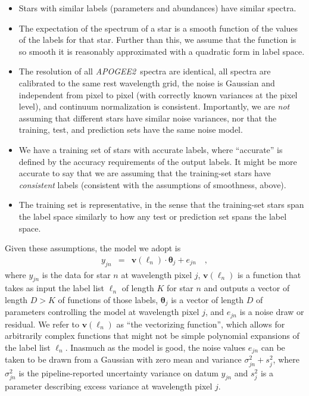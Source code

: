 \documentclass[12pt,preprint]{aastex}
\newcommand{\project}[1]{\textsl{#1}}
\newcommand{\TheCannon}{\project{The~Cannon}}
\newcommand{\acronym}[1]{{\small{#1}}}
\newcommand{\apogee}{\project{\acronym{APOGEE2}}}
\newcommand{\Dvector}[1]{\boldsymbol{#1}}
\newcommand{\vectheta}{\Dvector{\theta}}
\newcommand{\vecv}{\Dvector{v}}
\begin{document}
\begin{itemize}
\item
Stars with similar labels (parameters and abundances) have similar
spectra.
\item
The expectation of the spectrum of a star is a smooth function of the
values of the labels for that star.  Further than this, we assume that
the function is so smooth it is reasonably approximated with a
quadratic form in label space.
\item
The resolution of all \apogee\ spectra are identical, all spectra are
calibrated to the same rest wavelength grid, the noise is Gaussian and
independent from pixel to pixel (with correctly known variances at the
pixel level), and continuum normalization is consistent.  Importantly,
we are \emph{not} assuming that different stars have similar noise
variances, nor that the training, test, and prediction sets have the
same noise model.
\item
We have a training set of stars with accurate labels, where
``accurate'' is defined by the accuracy requirements of the output
labels.  It might be more accurate to say that we are assuming that
the training-set stars have \emph{consistent} labels (consistent with
the assumptions of smoothness, above).
\item
The training set is representative, in the sense that the training-set
stars span the label space similarly to how any test or prediction set
spans the label space.
\end{itemize}


\noindent Given these assumptions, the model we adopt is
\begin{eqnarray}
  y_{jn} &=& \vecv(\ell_n)\cdot\vectheta_j + e_{jn}
  \label{eq:model}\quad ,
\end{eqnarray}
where $y_{jn}$ is the data for star $n$ at wavelength pixel $j$,
$\vecv(\ell_n)$ is a function that takes as input
the label list $\ell_n$ of length $K$ for star $n$
and outputs a vector of length $D>K$ of functions of those labels,
$\vectheta_j$ is a vector of length $D$ of parameters controlling the model at wavelength pixel $j$,
and $e_{jn}$ is a noise draw or residual.  We refer to $\vecv(\ell_n)$ as ``the vectorizing function'', which allows for arbitrarily complex functions that might not be simple polynomial expansions of the label list $\ell_n$.  
Inasmuch as the model is good, the noise values $e_{jn}$ can be taken to be
drawn from a Gaussian with zero mean and variance $\sigma^2_{jn}+s^2_j$,
where $\sigma^2_{jn}$ is the pipeline-reported uncertainty variance on datum
$y_{jn}$ and $s^2_j$ is a parameter describing excess variance at wavelength pixel $j$.
\end{document}
